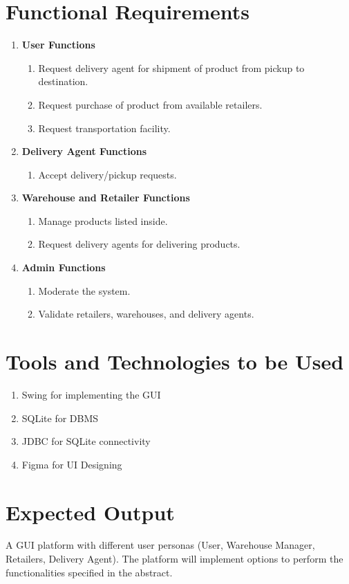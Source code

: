 \documentclass[12pt,a4paper]{article}
\begin{document}
\section*{Functional Requirements}
\begin{enumerate}
  \item \textbf{User Functions}
  \begin{enumerate}
    \item Request delivery agent for shipment of product from pickup to destination.
    \item Request purchase of product from available retailers.
    \item Request transportation facility.
  \end{enumerate}
  \item \textbf{Delivery Agent Functions}
  \begin{enumerate}
    \item Accept delivery/pickup requests.
  \end{enumerate}
  \item \textbf{Warehouse and Retailer Functions}
  \begin{enumerate}
    \item Manage products listed inside.
    \item Request delivery agents for delivering products.
  \end{enumerate}
  \item \textbf{Admin Functions}
  \begin{enumerate}
    \item Moderate the system.
    \item Validate retailers, warehouses, and delivery agents.
  \end{enumerate}
\end{enumerate}

\section*{Tools and Technologies to be Used}
\begin{enumerate}
  \item Swing for implementing the GUI
  \item SQLite for DBMS
  \item JDBC for SQLite connectivity
  \item Figma for UI Designing
\end{enumerate}

\section*{Expected Output}
A GUI platform with different user personas (User, Warehouse Manager, Retailers, Delivery Agent). The platform will implement options to perform the functionalities specified in the abstract.
\end{document}
